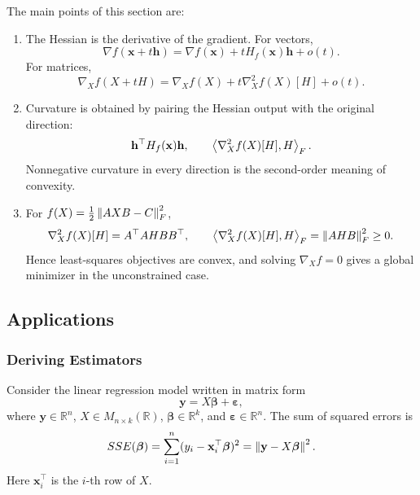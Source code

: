 \begin{gbox}
The main points of this section are:
\begin{enumerate}
    \item The Hessian is the derivative of the gradient. For vectors,
    \[
        \nabla f(\mathbf{x}+t\mathbf{h})
        =
        \nabla f(\mathbf{x})
        +
        tH_f(\mathbf{x})\mathbf{h}
        +
        o(t).
    \]
    For matrices,
    \[
        \nabla_X f(X+tH)
        =
        \nabla_X f(X)
        +
        t\nabla_X^2f(X)[H]
        +
        o(t).
    \]

    \item Curvature is obtained by pairing the Hessian output with the original
    direction:
    \[
        \mathbf{h}^\top H_f(\mathbf{x})\mathbf{h},
        \qquad
        \left\langle \nabla_X^2f(X)[H], H \right\rangle_F.
    \]
    Nonnegative curvature in every direction is the second-order meaning of
    convexity.

    \item For $f(X)=\frac12\left\lVert AXB-C \right\rVert_F^2$,
    \[
        \nabla_X^2f(X)[H]=A^\top AHB B^\top,
        \qquad
        \left\langle \nabla_X^2f(X)[H], H \right\rangle_F=\left\lVert AHB \right\rVert_F^2\ge0.
    \]
    Hence least-squares objectives are convex, and solving $\nabla_Xf=0$ gives
    a global minimizer in the unconstrained case.
\end{enumerate}
\end{gbox}






\subsection{Applications}

\subsubsection*{Deriving Estimators}

Consider the linear regression model written in matrix form
\[
    \mathbf{y}=X\boldsymbol{\beta}+\boldsymbol{\varepsilon},
\]
where $\mathbf{y}\in\mathbb{R}^n$, $X\in M_{n\times k}(\mathbb{R})$, $\boldsymbol{\beta}\in\mathbb{R}^k$, and $\boldsymbol{\varepsilon}\in\mathbb{R}^n$.
The sum of squared errors is
\[
    SSE(\boldsymbol{\beta})
    =
    \sum_{i=1}^n(y_i-\mathbf{x}_i^{\top}\boldsymbol{\beta})^2
    =
    \left\lVert \mathbf{y}-X\boldsymbol{\beta} \right\rVert^2.
\]
Here $\mathbf{x}_i^{\top}$ is the $i$-th row of $X$.

